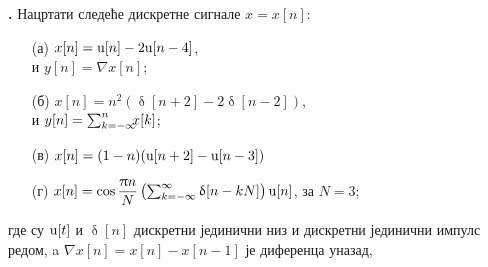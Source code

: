 \noindent
\textbf{\ID.}
Нацртати следеће
дискретне сигнале $x=x[n]$:
\begin{multicols}{2}
\begin{enumerate}
\item[(а)] $x[n] = {\rm u}[n] - 2{\rm u}[n-4]$, \\ и 
$y[n] = \nabla x[n]$;
\item[(б)] $x[n] = n^2( \updelta[n+2] - 2\updelta[n-2] )$, \\ и 
$y[n] = \sum_{k = -\infty}^n \hspace*{-0.5em}
 x[k]$;
\item[(в)] $x[n] = (1-n)({\rm u}[n+2] - {\rm u}[n-3])$
\item[(г)]  $x[n] = \cos\dfrac{\uppi n}{N}  
\left(
\sum_{k = -\infty}^{\infty} \updelta[n-kN]
\right)  {\rm u}[n] $, за $N = 3$;
\end{enumerate}
\end{multicols}
\noindent
где су ${\rm u}[t]$ и $\updelta[n]$ дискретни 
јединични низ
и дискретни јединични импулс редом, a $\nabla x[n] = x[n] - x[n-1]$ је диференца уназад,
\vspace*{5mm}

